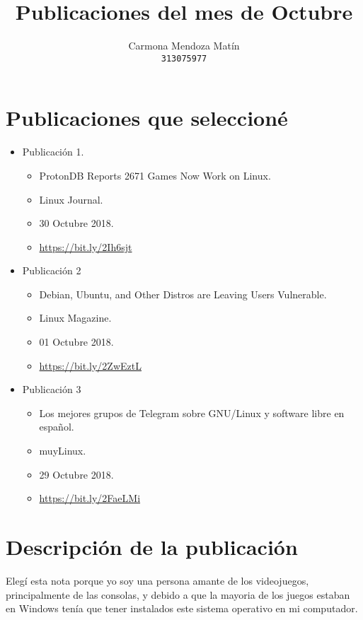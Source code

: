 \documentclass[11pt, a4paper]{report}
\begin{document}
\title{Publicaciones del mes de Octubre}
\author{
  Carmona Mendoza Mat\'in\\
  \texttt{313075977}
}
\date{}
\maketitle

\section*{Publicaciones que seleccioné}
\begin{itemize}

\item Publicación 1.
  \begin{itemize}
  \item ProtonDB Reports 2671 Games Now Work on Linux.
  \item Linux Journal.
  \item 30 Octubre 2018.
  \item \url{https://bit.ly/2Ih6sjt}
  \end{itemize}
  
\item Publicación 2
  \begin{itemize}
  \item Debian, Ubuntu, and Other Distros are Leaving Users Vulnerable.
  \item Linux Magazine.
  \item 01 Octubre 2018. 
  \item \url{https://bit.ly/2ZwEztL}
  \end{itemize}

\item Publicación 3
  \begin{itemize}
  \item Los mejores grupos de Telegram sobre GNU/Linux y software libre en
    español.
  \item muyLinux.
  \item 29 Octubre 2018.
  \item \url{https://bit.ly/2FaeLMi}
  \end{itemize}
\end{itemize}  


\section*{Descripción de la publicación}
Elegí esta nota porque yo soy una persona amante de los videojuegos,
principalmente de las consolas, y debido a que la mayoria de los juegos estaban
en Windows tenía que tener instalados este sistema operativo en mi computador.
\end{document}
